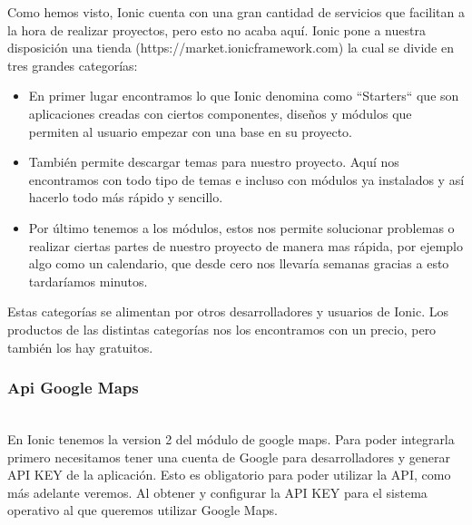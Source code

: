 \documentclass[a4paper, 11pt]{article}
\begin{document}
\begin{itemize}
                Como hemos visto, Ionic cuenta con una gran cantidad de servicios
                que facilitan a la hora de realizar proyectos, pero esto no acaba
                aquí. Ionic pone a nuestra disposición una tienda
                (https://market.ionicframework.com) la cual se divide en tres
                grandes categorías:\\
                \begin{itemize}
                    \item{En primer lugar encontramos lo que Ionic denomina como
                    ``Starters`` que son aplicaciones creadas con ciertos componentes,
                    diseños y módulos que permiten al usuario empezar con una
                    base en su proyecto.}
                    \item{También permite descargar temas para nuestro proyecto.
                    Aquí nos encontramos con todo tipo de temas e incluso con
                    módulos ya instalados y así hacerlo todo más rápido
                    y sencillo.}
                    \item{Por último tenemos a los módulos, estos nos permite
                    solucionar problemas o realizar ciertas partes de nuestro proyecto
                    de manera mas rápida, por ejemplo algo como un calendario,
                    que desde cero nos llevaría semanas gracias a esto tardaríamos
                    minutos.}
                \end{itemize}

                Estas categorías se alimentan por otros desarrolladores y usuarios
                de Ionic. Los productos de las distintas categorías nos los
                encontramos con un precio, pero también los hay gratuitos.\\



            \subsubsection{Api Google Maps}\\

              En Ionic tenemos la version 2 del módulo de google maps. Para
              poder integrarla primero necesitamos tener una cuenta de Google
              para desarrolladores y generar API KEY de la aplicación. Esto es
              obligatorio para poder utilizar la API, como más adelante veremos.
              Al obtener y configurar la API KEY para el sistema operativo al
              que queremos utilizar Google Maps.\\


\end{itemize}
\end{document}
